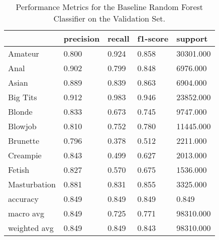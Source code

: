 \begin{table}[htbp]
\centering
\caption{Performance Metrics for the Baseline Random Forest Classifier on the Validation Set.}
\label{tab:rf-baseline-metrics}
\begin{tabular}{lllll}
\toprule
 & precision & recall & f1-score & support \\
\midrule
Amateur & 0.800 & 0.924 & 0.858 & 30301.000 \\
Anal & 0.902 & 0.799 & 0.848 & 6976.000 \\
Asian & 0.889 & 0.839 & 0.863 & 6904.000 \\
Big Tits & 0.912 & 0.983 & 0.946 & 23852.000 \\
Blonde & 0.833 & 0.673 & 0.745 & 9747.000 \\
Blowjob & 0.810 & 0.752 & 0.780 & 11445.000 \\
Brunette & 0.796 & 0.378 & 0.512 & 2211.000 \\
Creampie & 0.843 & 0.499 & 0.627 & 2013.000 \\
Fetish & 0.827 & 0.570 & 0.675 & 1536.000 \\
Masturbation & 0.881 & 0.831 & 0.855 & 3325.000 \\
accuracy & 0.849 & 0.849 & 0.849 & 0.849 \\
macro avg & 0.849 & 0.725 & 0.771 & 98310.000 \\
weighted avg & 0.849 & 0.849 & 0.843 & 98310.000 \\
\bottomrule
\end{tabular}

\end{table}